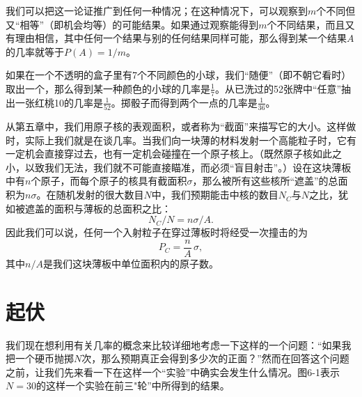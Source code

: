 \documentclass[12pt,oneside]{book}
\begin{document}
\begin{common-format}
我们可以把这一论证推广到任何一种情况；在这种情况下，可以观察到$m$个不同但又“相等”（即机会均等）的可能结果。如果通过观察能得到$m$个不同结果，而且又有理由相信，其中任何一个结果与别的任何结果同样可能，那么得到某一个结果$A$的几率就等于$P(A)=1/m$。

如果在一个不透明的盒子里有7个不同颜色的小球，我们“随便”（即不朝它看时）取出一个，那么得到某一种颜色的小球的几率是$\frac{1}{7}$。从已洗过的52张牌中“任意”抽出一张红桃10的几率是$\frac{1}{52}$。掷骰子而得到两个一点的几率是$ \frac{1}{36} $。
\begin{center}
\makebox[200pt]{\hrulefill}
\end{center}

\begin{small}
从第五章中，我们用原子核的表观面积，或者称为“截面”来描写它的大小。这样做时，实际上我们就是在谈几率。当我们向一块薄的材料发射一个高能粒子时，它有一定机会直接穿过去，也有一定机会碰撞在一个原子核上。（既然原子核如此之小，以致我们无法，我们就不可能直接瞄准，而必须“盲目射击”。）设在这块薄板中有$n$个原子，而每个原子的核具有截面积$\sigma$，那么被所有这些核所“遮盖”的总面积为$n\sigma$。在随机发射的很大数目$N$中，我们预期能击中核的数目$N_C$与$N$之比，犹如被遮盖的面积与薄板的总面积之比：
\begin{equation}
\label{Eq:I:6:2}
N_C/N=n\sigma/A.
\end{equation}
因此我们可以说，任何一个入射粒子在穿过薄板时将经受一次撞击的为
\begin{equation}
\label{Eq:I:6:3}
P_C=\frac{n}{A}\,\sigma,
\end{equation}
其中$n/A$是我们这块薄板中单位面积内的原子数。
\end{small}



\section{起伏}
我们现在想利用有关几率的概念来比较详细地考虑一下这样的一个问题：“如果我把一个硬币抛掷$N$次，那么预期真正会得到多少次的正面？”然而在回答这个问题之前，让我们先来看一下在这样一个“实验”中确实会发生什么情况。图6-1表示$N=30$的这样一个实验在前三"轮”中所得到的结果。


\end{common-format}
\end{document}
